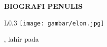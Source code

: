 \begin{center}
    \Large
    \textbf{BIOGRAFI PENULIS}
  \end{center}
  
  
  \vspace{2ex}
  
  \begin{wrapfigure}{L}{0.3\textwidth}
    \centering
    \vspace{-3ex}
    \texttt{[image: gambar/elon.jpg]}
    \vspace{-4ex}
  \end{wrapfigure}
  
  \name{}, lahir pada \lipsum[1]
  
  \lipsum[2]
